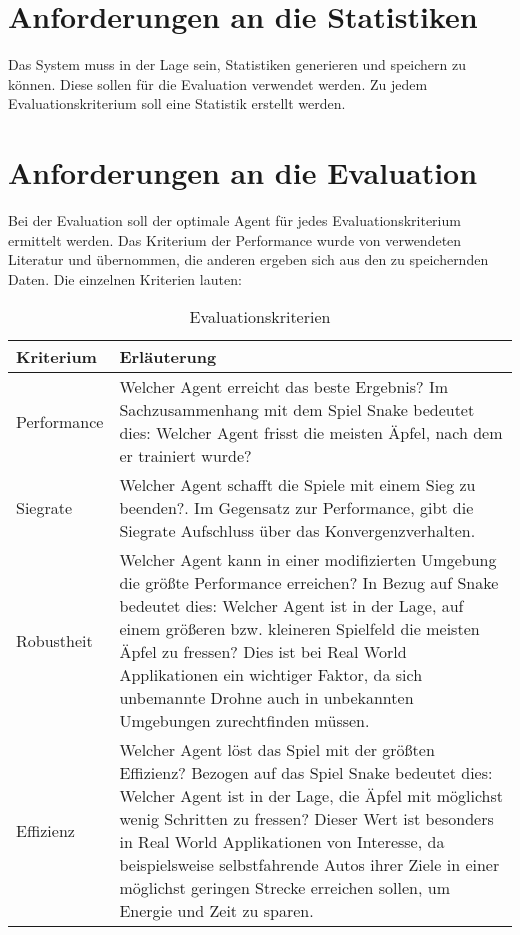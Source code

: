 \section{Anforderungen an die Statistiken} \label{sec:Anforderungen_Statistik}
Das System muss in der Lage sein, Statistiken generieren und speichern zu können. Diese sollen für die Evaluation verwendet werden. Zu jedem Evaluationskriterium  soll eine Statistik erstellt werden. 

\section{Anforderungen an die Evaluation} \label{sec:Anforderungen_an_die_Evaluation}
Bei der Evaluation soll der optimale Agent für jedes Evaluationskriterium ermittelt werden.
Das Kriterium der Performance wurde von verwendeten Literatur \cite{Autonomous_Agents_in_Snake_Game_via_DRL} und \cite{UAV} übernommen, die anderen ergeben sich aus den zu speichernden Daten.
Die einzelnen Kriterien lauten:
\begin{longtable}[h]{|p{4cm}|p{\linewidth - 5cm}|}
	\caption{Evaluationskriterien}
	\label{tab:Anforderungen_Kriterien} 
	\endfirsthead
	\endhead
	\hline
	Kriterium & Erläuterung \\
	\hline
	Performance & Welcher Agent erreicht das beste Ergebnis? Im Sachzusammenhang mit dem Spiel Snake bedeutet dies: Welcher Agent frisst die meisten Äpfel, nach dem er trainiert wurde?\\
	\hline
	Siegrate & Welcher Agent schafft die Spiele mit einem Sieg zu beenden?. Im Gegensatz zur Performance, gibt die Siegrate Aufschluss über das Konvergenzverhalten.\\
	\hline
	Robustheit & Welcher Agent kann in einer modifizierten Umgebung die größte Performance erreichen? In Bezug auf Snake bedeutet dies: Welcher Agent ist in der Lage, auf einem größeren bzw. kleineren Spielfeld die meisten Äpfel zu fressen? Dies ist bei Real World Applikationen ein wichtiger Faktor, da sich unbemannte Drohne auch in unbekannten Umgebungen zurechtfinden müssen.\\
	\hline
	Effizienz & Welcher Agent löst das Spiel mit der größten Effizienz? Bezogen auf das Spiel Snake bedeutet dies: Welcher Agent ist in der Lage, die Äpfel mit möglichst wenig Schritten zu fressen? Dieser Wert ist besonders in Real World Applikationen von Interesse, da beispielsweise selbstfahrende Autos ihrer Ziele in einer möglichst geringen Strecke erreichen sollen, um Energie und Zeit zu sparen.\\
	\hline
\end{longtable}